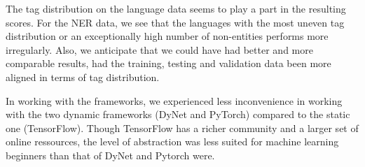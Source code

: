 The tag distribution on the language data seems to play a part in the resulting
scores. For the NER data, we see that the languages with the most uneven tag
distribution or an exceptionally high number of non-entities performs more
irregularly. Also, we anticipate that we could have had better and more
comparable results, had the training, testing and validation data been more
aligned in terms of tag distribution.

In working with the frameworks, we experienced less inconvenience in working
with the two dynamic frameworks (DyNet and PyTorch) compared to the static one
(TensorFlow). Though TensorFlow has a richer community and a larger set of
online ressources, the level of abstraction was less suited for machine learning
beginners than that of DyNet and Pytorch were.

\pagebreak

